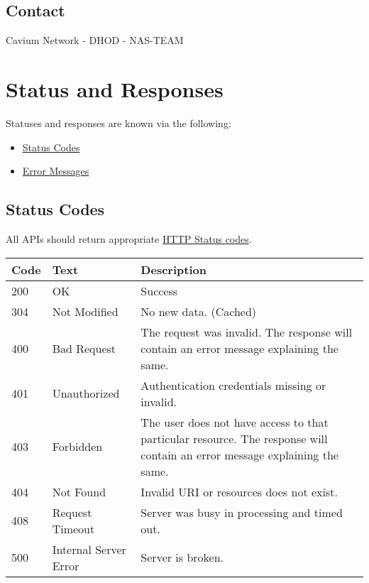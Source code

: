 \documentclass[letterpaper,10pt,english]{sphinxmanual}
\begin{document}
\section{Contact}
\label{intro:contact}
Cavium Network - DHOD - NAS-TEAM


\chapter{Status and Responses}
\label{responses::doc}\label{responses:status-and-responses}
Statuses and responses are known via the following:
\begin{itemize}
\item {} 
{\hyperref[responses:status-code]{Status Codes}}

\item {} 
{\hyperref[responses:error-message]{Error Messages}}

\end{itemize}


\section{Status Codes}
\label{responses:id1}\label{responses:status-code}
All APIs should return appropriate \href{http://en.wikipedia.org/wiki/List\_of\_HTTP\_status\_codes}{HTTP Status codes}.

\begin{tabulary}{\linewidth}{|L|L|L|}
\hline
\textbf{
Code
} & \textbf{
Text
} & \textbf{
Description
}\\\hline

200
 & 
OK
 & 
Success
\\\hline

304
 & 
Not Modified
 & 
No new data. (Cached)
\\\hline

400
 & 
Bad Request
 & 
The request was invalid.
The response will contain
an error message
explaining the same.
\\\hline

401
 & 
Unauthorized
 & 
Authentication
credentials missing or
invalid.
\\\hline

403
 & 
Forbidden
 & 
The user does not have
access to that particular
resource. The response
will contain an error
message explaining the
same.
\\\hline

404
 & 
Not Found
 & 
Invalid URI or resources
does not exist.
\\\hline

408
 & 
Request Timeout
 & 
Server was busy in
processing and timed out.
\\\hline

500
 & 
Internal Server
Error
 & 
Server is broken.
\\\hline
\end{tabulary}
\end{document}
